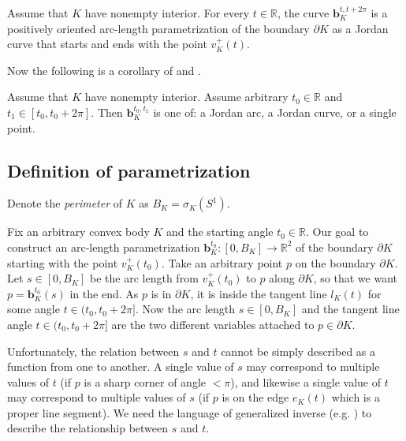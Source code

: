 \begin{theorem}

Assume that \(K\) have nonempty interior. For every \(t \in \mathbb{R}\), the curve \(\mathbf{b}_K^{t, t + 2\pi}\) is a positively oriented arc-length parametrization of the boundary \(\partial K\) as a Jordan curve that starts and ends with the point \(v_K^+(t)\).

\label{thm:param-positive-jordan}
\end{theorem}

Now the following is a corollary of  and .

\begin{corollary}

Assume that \(K\) have nonempty interior. Assume arbitrary \(t_0 \in \mathbb{R}\) and \(t_1 \in [t_0, t_0 + 2\pi]\). Then \(\mathbf{b}_K^{t_0, t_1}\) is one of: a Jordan arc, a Jordan curve, or a single point.

\label{cor:param-positive-jordan}
\end{corollary}

\subsection{Definition of parametrization}

\begin{definition}

Denote the \emph{perimeter} of \(K\) as \(B_K = \sigma_K\left( S^1 \right)\).

\label{def:convex-body-perimeter}
\end{definition}

Fix an arbitrary convex body \(K\) and the starting angle \(t_0 \in \mathbb{R}\). Our goal to construct an arc-length parametrization \(\mathbf{b}_{K}^{t_0} : [0, B_K] \to \mathbb{R}^2\) of the boundary \(\partial K\) starting with the point \(v_K^+(t_0)\). Take an arbitrary point \(p\) on the boundary \(\partial K\). Let \(s \in [0, B_K]\) be the arc length from \(v_K^+(t_0)\) to \(p\) along \(\partial K\), so that we want \(p = \mathbf{b}_{K}^{t_0}(s)\) in the end. As \(p\) is in \(\partial K\), it is inside the tangent line \(l_K(t)\) for some angle \(t \in (t_0, t_0 + 2\pi]\). Now the arc length \(s \in [0, B_K]\) and the tangent line angle \(t \in (t_0, t_0 + 2\pi]\) are the two different variables attached to \(p \in \partial K\).

Unfortunately, the relation between \(s\) and \(t\) cannot be simply described as a function from one to another. A single value of \(s\) may correspond to multiple values of \(t\) (if \(p\) is a sharp corner of angle \(< \pi\)), and likewise a single value of \(t\) may correspond to multiple values of \(s\) (if \(p\) is on the edge \(e_K(t)\) which is a proper line segment). We need the language of generalized inverse (e.g. \autocite{fortelleStudyGeneralizedInverses}) to describe the relationship between \(s\) and \(t\).

